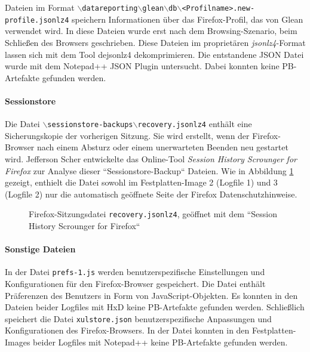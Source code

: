 \begin{appendices}
Dateien im Format \texttt{$\backslash$datareporting$\backslash$glean$\backslash$db$\backslash$<Profilname>.new-profile.jsonlz4} speichern Informationen über das Firefox-Profil, das von Glean verwendet wird. In diese Dateien wurde erst nach dem Browsing-Szenario, beim Schließen des Browsers geschrieben. Diese Dateien im proprietären \textit{jsonlz4}-Format lassen sich mit dem Tool dejsonlz4 dekomprimieren. Die entstandene JSON Datei wurde mit dem Notepad++ JSON Plugin untersucht. Dabei konnten keine PB-Artefakte gefunden werden.

\paragraph*{Sessionstore}
Die Datei \texttt{$\backslash$sessionstore-backups$\backslash$recovery.jsonlz4} enthält eine Sicherungskopie der vorherigen Sitzung. Sie wird erstellt, wenn der Firefox-Browser nach einem Absturz oder einem unerwarteten Beenden neu gestartet wird. 
Jefferson Scher entwickelte das Online-Tool \textit{Session History Scrounger for Firefox} zur Analyse dieser ``Sessionstore-Backup`` Dateien. \cite{JeffersonScher.29.11.2020}
Wie in Abbildung \ref{img:firefox-session-history-scrounger} gezeigt, enthielt die Datei sowohl im Festplatten-Image 2 (Logfile 1) und 3 (Logfile 2) nur die automatisch geöffnete Seite der Firefox Datenschutzhinweise.
\begin{figure}[h!]
	\caption{Firefox-Sitzungsdatei \texttt{recovery.jsonlz4}, geöffnet mit dem ``Session History Scrounger for Firefox``}
	\label{img:firefox-session-history-scrounger}
\end{figure}

\paragraph*{Sonstige Dateien}
In der Datei \texttt{prefs-1.js} werden benutzerspezifische Einstellungen und Konfigurationen für den Firefox-Browser gespeichert. Die Datei enthält Präferenzen des Benutzers in Form von JavaScript-Objekten. Es konnten in den Dateien beider Logfiles mit HxD keine PB-Artefakte gefunden werden. 
Schließlich speichert die Datei \texttt{xulstore.json} benutzerspezifische Anpassungen und Konfigurationen des Firefox-Browsers. In der Datei konnten in den Festplatten-Images beider Logfiles mit Notepad++ keine PB-Artefakte gefunden werden. \cite{mozillazine.29.12.2022}


\end{appendices}
